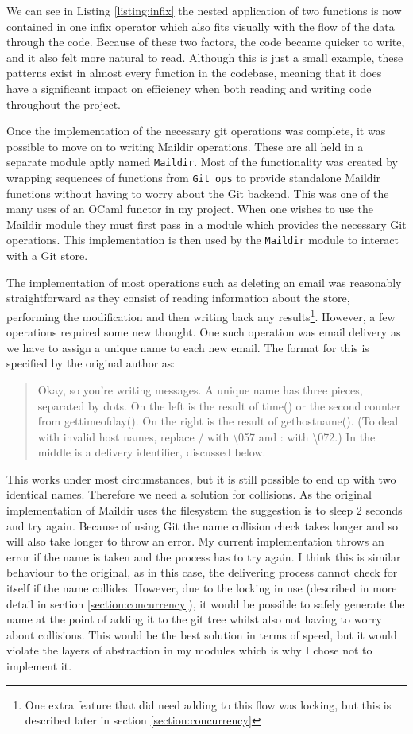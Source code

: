 We can see in Listing \ref{listing:infix} the nested application of two functions is now contained in one infix operator which also fits visually with the flow of the data through the code. Because of these two factors, the code became quicker to write, and it also felt more natural to read. Although this is just a small example, these patterns exist in almost every function in the codebase, meaning that it does have a significant impact on efficiency when both reading and writing code throughout the project.

Once the implementation of the necessary git operations was complete, it was possible to move on to writing Maildir operations. These are all held in a separate module aptly named \texttt{Maildir}. Most of the functionality was created by wrapping sequences of functions from \texttt{Git\_ops} to provide standalone Maildir functions without having to worry about the Git backend. This was one of the many uses of an OCaml functor in my project. When one wishes to use the Maildir module they must first pass in a module which provides the necessary Git operations. This implementation is then used by the \texttt{Maildir} module to interact with a Git store.

The implementation of most operations such as deleting an email was reasonably straightforward as they consist of reading information about the store, performing the modification and then writing back any results\footnote{One extra feature that did need adding to this flow was locking, but this is described later in section \ref{section:concurrency}}. However, a few operations required some new thought. One such operation was email delivery as we have to assign a unique name to each new email. The format for this is specified by the original author\cite{bernstein2000maildir} as:
\begin{quote}
  Okay, so you're writing messages. A unique name has three pieces, separated by dots. On the left is the result of time() or the second counter from gettimeofday(). On the right is the result of gethostname(). (To deal with invalid host names, replace / with \textbackslash057 and : with \textbackslash072.) In the middle is a delivery identifier, discussed below.
\end{quote}
This works under most circumstances, but it is still possible to end up with two identical names. Therefore we need a solution for collisions. As the original implementation of Maildir uses the filesystem the suggestion is to sleep 2 seconds and try again. Because of using Git the name collision check takes longer and so will also take longer to throw an error. My current implementation throws an error if the name is taken and the process has to try again. I think this is similar behaviour to the original, as in this case, the delivering process cannot check for itself if the name collides. However, due to the locking in use (described in more detail in section \ref{section:concurrency}), it would be possible to safely generate the name at the point of adding it to the git tree whilst also not having to worry about collisions. This would be the best solution in terms of speed, but it would violate the layers of abstraction in my modules which is why I chose not to implement it.

